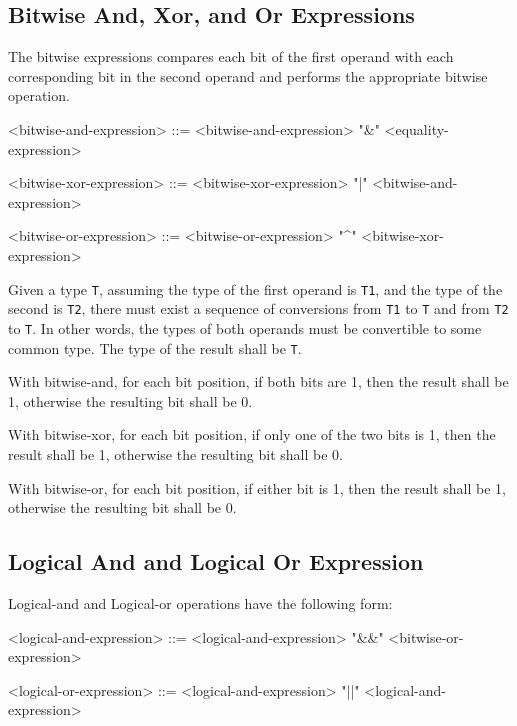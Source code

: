 \subsection{Bitwise And, Xor, and Or Expressions} \label{bitwise_expr_guide}

The bitwise expressions compares each bit of the first operand with each corresponding bit in the second operand and performs the appropriate bitwise operation.

\begin{minip}
\begin{grammar}
<bitwise-and-expression> ::= <bitwise-and-expression> "\&" <equality-expression>

<bitwise-xor-expression> ::= <bitwise-xor-expression> "|" <bitwise-and-expression>

<bitwise-or-expression> ::= <bitwise-or-expression> "^" <bitwise-xor-expression>
\end{grammar}
\end{minip}

Given a type \texttt{T}, assuming the type of the first operand is \texttt{T1}, and the type of the second is \texttt{T2}, there must exist a sequence of conversions from \texttt{T1} to \texttt{T} and from \texttt{T2} to \texttt{T}. In other words, the types of both operands must be convertible to some common type. The type of the result shall be \texttt{T}.

With bitwise-and, for each bit position, if both bits are 1, then the result shall be 1, otherwise the resulting bit shall be 0. 

With bitwise-xor, for each bit position, if only one of the two bits is 1, then the result shall be 1, otherwise the resulting bit shall be 0.

With bitwise-or, for each bit position, if either bit is 1, then the result shall be 1, otherwise the resulting bit shall be 0.

\subsection{Logical And and Logical Or Expression} \label{logical_expr_guide}

Logical-and and Logical-or operations have the following form:

\begin{minip}
\begin{grammar}
<logical-and-expression> ::= <logical-and-expression> "\&\&" <bitwise-or-expression>

<logical-or-expression> ::= <logical-and-expression> "||" <logical-and-expression>
\end{grammar}
\end{minip}

